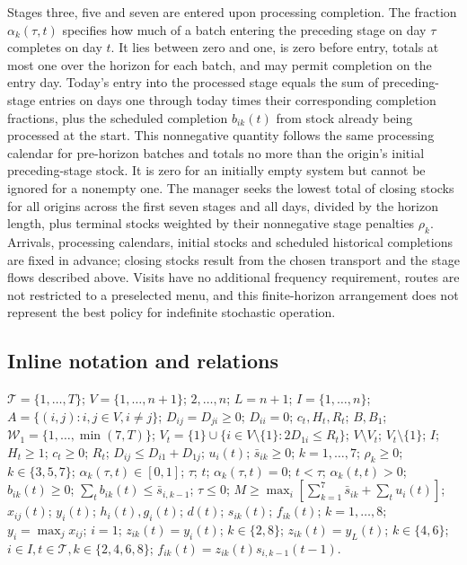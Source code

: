 \documentclass[10pt]{article}
\begin{document}
Stages three, five and seven are entered upon processing completion. The fraction $\alpha_k(\tau,t)$ specifies how much of a batch entering the preceding stage on day $\tau$ completes on day $t$. It lies between zero and one, is zero before entry, totals at most one over the horizon for each batch, and may permit completion on the entry day. Today's entry into the processed stage equals the sum of preceding-stage entries on days one through today times their corresponding completion fractions, plus the scheduled completion $b_{ik}(t)$ from stock already being processed at the start. This nonnegative quantity follows the same processing calendar for pre-horizon batches and totals no more than the origin's initial preceding-stage stock. It is zero for an initially empty system but cannot be ignored for a nonempty one. The manager seeks the lowest total of closing stocks for all origins across the first seven stages and all days, divided by the horizon length, plus terminal stocks weighted by their nonnegative stage penalties $\rho_k$. Arrivals, processing calendars, initial stocks and scheduled historical completions are fixed in advance; closing stocks result from the chosen transport and the stage flows described above. Visits have no additional frequency requirement, routes are not restricted to a preselected menu, and this finite-horizon arrangement does not represent the best policy for indefinite stochastic operation.

\subsection*{Inline notation and relations}
$\mathcal T=\{1,\ldots,T\}$; $V=\{1,\ldots,n+1\}$; $2,\ldots,n$; $L=n+1$; $I=\{1,\ldots,n\}$; $A=\{(i,j):i,j\in V,i\ne j\}$; $D_{ij}=D_{ji}\geq0$; $D_{ii}=0$; $c_t,H_t,R_t$; $B,B_1$; $\mathcal W_1=\{1,\ldots,\min(7,T)\}$; $V_t=\{1\}\cup\{i\in V\setminus\{1\}:2D_{1i}\leq R_t\}$; $V\setminus V_t$; $V_t\setminus\{1\}$; $I$; $H_t\ge1$; $c_t\ge0$; $R_t$; $D_{ij}\leq D_{i1}+D_{1j}$; $u_i(t)$; $\bar s_{ik}\geq0$; $k=1,\ldots,7$; $\rho_k\geq0$; $k\in\{3,5,7\}$; $\alpha_k(\tau,t)\in[0,1]$; $\tau$; $t$; $\alpha_k(\tau,t)=0$; $t<\tau$; $\alpha_k(t,t)>0$; $b_{ik}(t)\geq0$; $\sum_t b_{ik}(t)\leq\bar s_{i,k-1}$; $\tau\leq0$; $M\geq\max_i[\sum_{k=1}^7\bar s_{ik}+\sum_tu_i(t)]$; $x_{ij}(t)$; $y_i(t)$; $h_i(t),g_i(t)$; $d(t)$; $s_{ik}(t)$; $f_{ik}(t)$; $k=1,\ldots,8$; $y_i=\max_jx_{ij}$; $i=1$; $z_{ik}(t)=y_i(t)$; $k\in\{2,8\}$; $z_{ik}(t)=y_L(t)$; $k\in\{4,6\}$; $i\in I,t\in\mathcal T,k\in\{2,4,6,8\}$; $f_{ik}(t)=z_{ik}(t)s_{i,k-1}(t-1)$.
\end{document}
